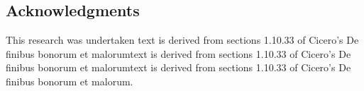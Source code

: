 \documentclass[a0,portrait]{a0poster}
\begin{document}
\begin{minipage}[c]{\linewidth}
\begin{framed}
\begin{multicols}{2}
\section*{Acknowledgments}
\tiny \textnormal{This research was undertaken text is derived from sections 1.10.33 of Cicero's De finibus bonorum et malorumtext is derived from sections 1.10.33 of Cicero's De finibus bonorum et malorumtext is derived from sections 1.10.33 of Cicero's De finibus bonorum et malorum.}
\end{multicols}
\vspace{0.5cm}
\end{framed}
\end{minipage}
\end{document}
